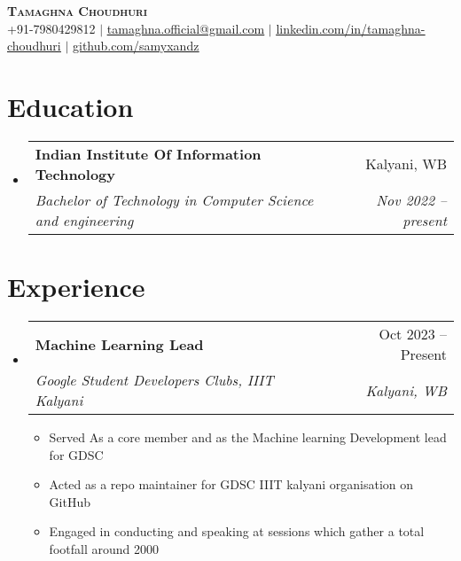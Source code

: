 \documentclass[letterpaper,11pt]{article}
\makeatletter
\newcommand{\resumeItem}[1]{
  \item\small{
    {#1 \vspace{-2pt}}
  }
}
\newcommand{\resumeSubheading}[4]{
  \vspace{-2pt}\item
    \begin{tabular*}{0.97\textwidth}[t]{l@{\extracolsep{\fill}}r}
      \textbf{#1} & #2 \\
      \textit{\small#3} & \textit{\small #4} \\
    \end{tabular*}\vspace{-7pt}
}
\newcommand{\resumeSubSubheading}[2]{
    \item
    \begin{tabular*}{0.97\textwidth}{l@{\extracolsep{\fill}}r}
      \textit{\small#1} & \textit{\small #2} \\
    \end{tabular*}\vspace{-7pt}
}
\newcommand{\resumeSubHeadingListStart}{\begin{itemize}[leftmargin=0.15in, label={}]}
\newcommand{\resumeSubHeadingListEnd}{\end{itemize}}
\newcommand{\resumeItemListStart}{\begin{itemize}}
\newcommand{\resumeItemListEnd}{\end{itemize}\vspace{-5pt}}
\makeatother
\begin{document}

\begin{center}
    \textbf{\Huge \scshape Tamaghna Choudhuri} \\ \vspace{1pt}
    \small +91-7980429812 $|$ \href{mailto:x@x.com}{\underline{tamaghna.official@gmail.com}} $|$ 
    \href{https://linkedin.com/in/...}{\underline{linkedin.com/in/tamaghna-choudhuri}} $|$
    \href{https://github.com/...}{\underline{github.com/samyxandz}}
\end{center}


\section{Education}
  \resumeSubHeadingListStart
    \resumeSubheading
      {Indian Institute Of Information Technology}{Kalyani, WB}
      {Bachelor of Technology in Computer Science and engineering}{Nov 2022 -- present}
  \resumeSubHeadingListEnd

\section{Experience}
  \resumeSubHeadingListStart

    \resumeSubheading
      {Machine Learning Lead}{Oct 2023 -- Present}
      {Google Student Developers Clubs, IIIT Kalyani}{Kalyani, WB}
      \resumeItemListStart
        \resumeItem{Served As a core member and as the Machine learning Development lead for GDSC}
        \resumeItem{Acted as a repo maintainer for GDSC IIIT kalyani organisation on GitHub}
        \resumeItem{Engaged in conducting and speaking at sessions which gather a total footfall around 2000}
      \resumeItemListEnd
      
  \resumeSubHeadingListEnd
\end{document}
